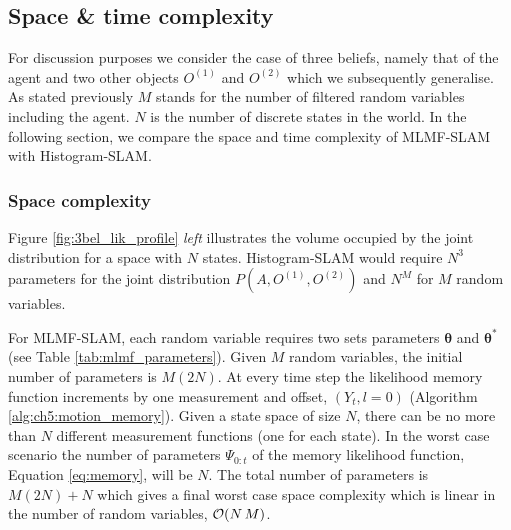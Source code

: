 \subsection{Space \& time complexity}\label{ch5:space_time_complexity_MLMF}

For discussion purposes we consider the case of three beliefs, namely that of the agent and two other objects $O^{(1)}$ and $O^{(2)}$ which we
subsequently generalise. As stated previously $M$ stands for the number of filtered random variables including the agent. 
$N$ is the number of discrete states in the world. In the following section, we compare the space and time complexity 
of MLMF-SLAM with Histogram-SLAM.


\subsubsection{Space complexity}

Figure \ref{fig:3bel_lik_profile} \textit{left} illustrates the volume occupied by the joint distribution
for a space with $N$ states. Histogram-SLAM would require $N^3$ parameters for the joint distribution $P(A,O^{(1)},O^{(2)})$ and $N^{M}$ for $M$ random variables. 

For MLMF-SLAM, each random variable requires two sets parameters $\boldsymbol{\theta}$ and $\boldsymbol{\theta}^*$ 
(see Table \ref{tab:mlmf_parameters}). Given
$M$ random variables, the initial number of parameters is $M (2 N)$.
At every time step the likelihood memory function increments by one measurement and offset, $(Y_t,l=0)$ (Algorithm \ref{alg:ch5:motion_memory}).
Given a state space of size $N$, there can be no more than $N$ different measurement functions (one for each state). In
the worst case scenario the number of parameters $\Psi_{0:t}$ of the memory likelihood function, Equation \ref{eq:memory}, will be $N$.
The total number of parameters is $M (2 N) + N$ which gives a final worst case space complexity which is linear in the number of 
random variables, $\operatorname{\mathcal{O}}(N\,M)$. 

